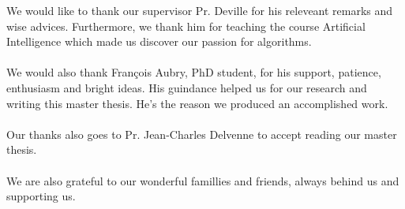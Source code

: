 
We would like to thank our supervisor Pr. Deville for his releveant remarks and wise advices. Furthermore, we thank him for teaching the course Artificial Intelligence which made us discover our passion for algorithms. 
\\
\\
We would also thank Fran\c cois Aubry, PhD student, for his support, patience, enthusiasm and bright ideas. His guindance helped us for our research and writing this master thesis. He's the reason we produced an accomplished work. 
\\
\\
Our thanks also goes to Pr. Jean-Charles Delvenne to accept reading our master thesis. 
\\
\\
We are also grateful to our wonderful famillies and friends, always behind us and supporting us.